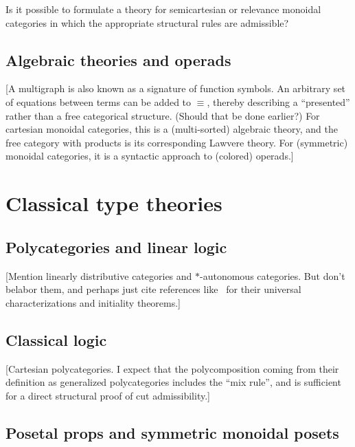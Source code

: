 \documentclass{book}
\begin{document}
\begin{ex}\label{ex:semicart-relevance-strucadm}
  Is it possible to formulate a theory for semicartesian or relevance monoidal categories in which the appropriate structural rules are admissible?
\end{ex}


\section{Algebraic theories and operads}
\label{sec:algthy-opd}

[A multigraph is also known as a signature of function symbols.
An arbitrary set of equations between terms can be added to $\equiv$, thereby describing a ``presented'' rather than a free categorical structure.
(Should that be done earlier?)
For cartesian monoidal categories, this is a (multi-sorted) algebraic theory, and the free category with products is its corresponding Lawvere theory.
For (symmetric) monoidal categories, it is a syntactic approach to (colored) operads.]



\chapter{Classical type theories}
\label{chap:polycats}


\section{Polycategories and linear logic}
\label{sec:cllin}

[Mention linearly distributive categories and $\ast$-autonomous categories.
But don't belabor them, and perhaps just cite references like~\cite{cs:wkdistrib} for their universal characterizations and initiality theorems.]


\section{Classical logic}
\label{sec:classical}

[Cartesian polycategories.  I expect that the polycomposition coming from their definition as generalized polycategories includes the ``mix rule'', and is sufficient for a direct structural proof of cut admissibility.]


\section{Posetal props and symmetric monoidal posets}
\label{sec:proppos-smpos}
\end{document}
